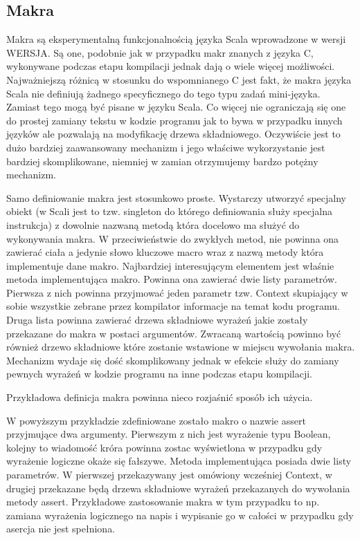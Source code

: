 \documentclass[brudnopis]{xmgr}
\begin{document}
\subsection{Makra}

Makra są eksperymentalną funkcjonalnością języka Scala wprowadzone w wersji WERSJA. Są one, podobnie jak w przypadku makr znanych z języka C, wykonywane podczas etapu kompilacji jednak dają o wiele więcej możliwości. Najważniejszą różnicą w stosunku do wspomnianego C jest fakt, że makra języka Scala nie definiują żadnego specyficznego do tego typu zadań mini-języka. Zamiast tego mogą być pisane w języku Scala. Co więcej nie ograniczają się one do prostej zamiany tekstu w kodzie programu jak to bywa w przypadku innych języków ale pozwalają na modyfikację drzewa składniowego. Oczywiście jest to dużo bardziej zaawansowany mechanizm i jego właściwe wykorzystanie jest bardziej skomplikowane, niemniej w zamian otrzymujemy bardzo potężny mechanizm.

Samo definiowanie makra jest stosunkowo proste. Wystarczy utworzyć specjalny obiekt (w Scali jest to tzw. singleton do którego definiowania służy specjalna instrukcja) z dowolnie nazwaną metodą która docelowo ma służyć do wykonywania makra. W przeciwieństwie do zwykłych metod, nie powinna ona zawierać ciała a jedynie słowo kluczowe macro wraz z nazwą metody która implementuje dane makro. Najbardziej interesującym elementem jest właśnie metoda implementująca makro. Powinna ona zawierać dwie listy parametrów. Pierwsza z nich powinna przyjmować jeden parametr tzw. Context skupiający w sobie wszystkie zebrane przez kompilator informacje na temat kodu programu. Druga lista powinna zawierać drzewa składniowe wyrażeń jakie zostały przekazane do makra w postaci argumentów. Zwracaną wartością powinno być również drzewo składniowe które zostanie wstawione w miejscu wywołania makra. Mechanizm wydaje się dość skomplikowany jednak w efekcie służy do zamiany pewnych wyrażeń w kodzie programu na inne podczas etapu kompilacji.

Przykładowa definicja makra powinna nieco rozjaśnić sposób ich użycia.



W powyższym przykładzie zdefiniowane zostało makro o nazwie assert przyjmujące dwa argumenty. Pierwszym z nich jest wyrażenie typu Boolean, kolejny to wiadomość króra powinna zostac wyświetlona w przypadku gdy wyrażenie logiczne okaże się fałszywe. Metoda implementująca posiada dwie listy parametrów. W pierwszej przekazywany jest omówiony wcześniej Context, w drugiej przekazane będą drzewa składniowe wyrażeń przekazanych do wywołania metody assert. Przykładowe zastosowanie makra w tym przypadku to np. zamiana wyrażenia logicznego na napis i wypisanie go w całości w przypadku gdy asercja nie jest spełniona.
\end{document}
